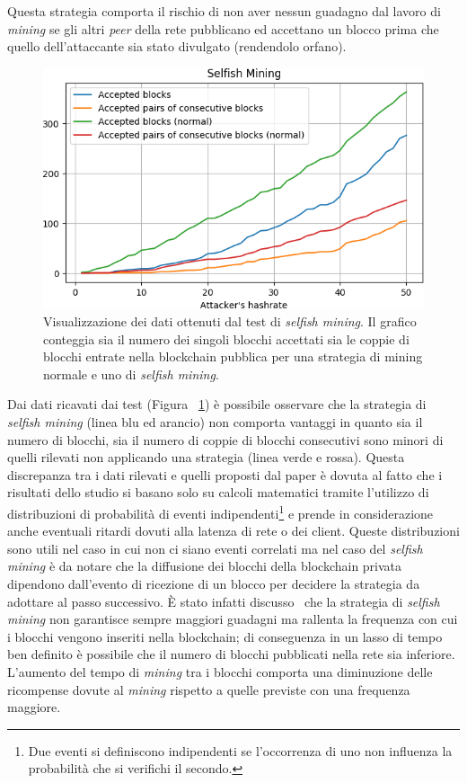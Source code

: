 Questa strategia comporta il rischio di non aver nessun guadagno dal lavoro di \textit{mining} se gli altri \textit{peer} della rete pubblicano ed accettano un blocco prima che quello dell'attaccante sia stato divulgato (rendendolo orfano).
\begin{figure}[H]
    \centering
    \includegraphics[width=\textwidth]{./images/selfishtest.png}
    \caption{Visualizzazione dei dati ottenuti dal test di \textit{selfish mining}. Il grafico conteggia sia il numero dei singoli blocchi accettati sia le coppie di blocchi entrate nella blockchain pubblica per una strategia di mining normale e uno di \textit{selfish mining}.}
    \label{fig:selfishtest}
\end{figure}
Dai dati ricavati dai test (Figura ~\ref{fig:selfishtest}) è possibile osservare che la strategia di \textit{selfish mining} (linea blu ed arancio) non comporta vantaggi in quanto sia il numero di blocchi, sia il numero di coppie di blocchi consecutivi sono minori di quelli rilevati non applicando una strategia (linea verde e rossa). Questa discrepanza tra i dati rilevati e quelli proposti dal paper è dovuta al fatto che i risultati dello studio si basano solo su calcoli matematici tramite l'utilizzo di distribuzioni di probabilità di eventi indipendenti\footnote{Due eventi si definiscono indipendenti se l'occorrenza di uno non influenza la probabilità che si verifichi il secondo.} e prende in considerazione anche eventuali ritardi dovuti alla latenza di rete o dei client. Queste distribuzioni sono utili nel caso in cui non ci siano eventi correlati ma nel caso del \textit{selfish mining} è da notare che la diffusione dei blocchi della blockchain privata dipendono dall'evento di ricezione di un blocco per decidere la strategia da adottare al passo successivo. È stato infatti discusso~\cite{selfishfallacy} che la strategia di \textit{selfish mining} non garantisce sempre maggiori guadagni ma rallenta la frequenza con cui i blocchi vengono inseriti nella blockchain; di conseguenza in un lasso di tempo ben definito è possibile che il numero di blocchi pubblicati nella rete sia inferiore. L'aumento del tempo di \textit{mining} tra i blocchi comporta una diminuzione delle ricompense dovute al \textit{mining} rispetto a quelle previste con una frequenza maggiore.\newline
